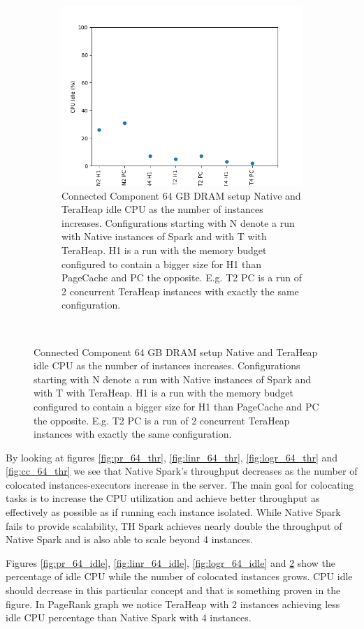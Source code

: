\begin{figure}[htbp]
\begin{subfigure}[b]{0.48\textwidth}
        \includegraphics[width=\linewidth]{./fig/CC_64_IDLE.png}
    \caption{Connected Component 64 GB DRAM setup Native and TeraHeap
    idle CPU as the number of instances increases. Configurations
    starting with N denote a run with Native instances of Spark and
    with T with TeraHeap. H1 is a run with the memory budget
    configured to contain a bigger size for H1 than PageCache and PC
    the opposite. E.g. T2 PC is a run of 2 concurrent TeraHeap
    instances with exactly the same configuration.}
	\label{fig:cc_64_idle}
\end{subfigure}\\[1em]
\end{figure}

By looking at figures \ref{fig:pr_64_thr}, \ref{fig:linr_64_thr},
\ref{fig:logr_64_thr} and \ref{fig:cc_64_thr} we see that Native
Spark's throughput decreases as the number of colocated
instances-executors increase in the server. The main goal for
colocating tasks is to increase the CPU utilization and achieve better
throughput as effectively as possible as if running each instance
isolated. While Native Spark fails to provide scalability, TH Spark
achieves nearly double the throughput of Native Spark and is also able
to scale beyond 4 instances.

Figures \ref{fig:pr_64_idle}, \ref{fig:linr_64_idle},
\ref{fig:logr_64_idle} and \ref{fig:cc_64_idle}  show the percentage
of idle CPU while the number of colocated instances grows. CPU idle
should decrease in this particular concept and that is something
proven in the figure. In PageRank graph we notice TeraHeap with 2
instances achieving less idle CPU percentage than Native Spark with 4
instances.

